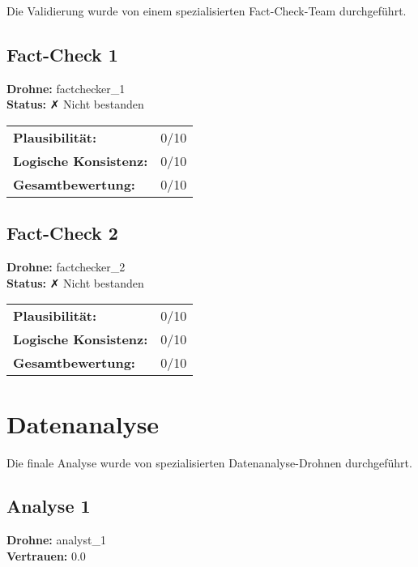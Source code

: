 \documentclass[12pt,a4paper]{article}
\begin{document}
Die Validierung wurde von einem spezialisierten Fact-Check-Team durchgeführt.


\subsection{Fact-Check 1}

\textbf{Drohne:} factchecker\_1\\
\textbf{Status:} ✗ Nicht bestanden\\

\begin{tabular}{ll}
\textbf{Plausibilität:} & 0/10 \\
\textbf{Logische Konsistenz:} & 0/10 \\
\textbf{Gesamtbewertung:} & 0/10 \\
\end{tabular}


\subsection{Fact-Check 2}

\textbf{Drohne:} factchecker\_2\\
\textbf{Status:} ✗ Nicht bestanden\\

\begin{tabular}{ll}
\textbf{Plausibilität:} & 0/10 \\
\textbf{Logische Konsistenz:} & 0/10 \\
\textbf{Gesamtbewertung:} & 0/10 \\
\end{tabular}



\newpage
\section{Datenanalyse}

Die finale Analyse wurde von spezialisierten Datenanalyse-Drohnen durchgeführt.

\subsection{Analyse 1}

\textbf{Drohne:} analyst\_1\\
\textbf{Vertrauen:} 0.0%
\end{document}
